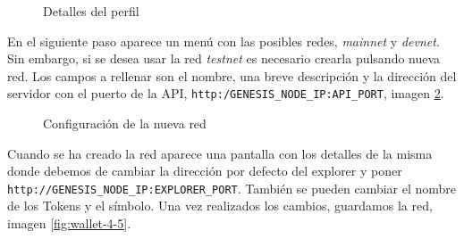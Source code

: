 \begin{figure}[H]
	\centering
	\caption{Detalles del perfil}
	\label{fig:wallet-2}
\end{figure}

En el siguiente paso aparece un menú con las posibles redes, \textit{mainnet} y \textit{devnet}. Sin embargo, si se desea usar la red \textit{testnet} es necesario crearla pulsando nueva red. Los campos a rellenar son el nombre, una breve descripción y la dirección del servidor con el puerto de la API, \texttt{http:/GENESIS\_NODE\_IP:API\_PORT}, imagen \ref{fig:wallet-3}.

\begin{figure}[H]
	\centering
	\caption{Configuración de la nueva red}
	\label{fig:wallet-3}
\end{figure}

\newpage
Cuando se ha creado la red aparece una pantalla con los detalles de la misma donde debemos de cambiar la dirección por defecto del explorer y poner \texttt{http://GENESIS\_NODE\_IP:EXPLORER\_PORT}. También se pueden cambiar el nombre de los Tokens y el símbolo. Una vez realizados los cambios, guardamos la red, imagen \ref{fig:wallet-4-5}.

